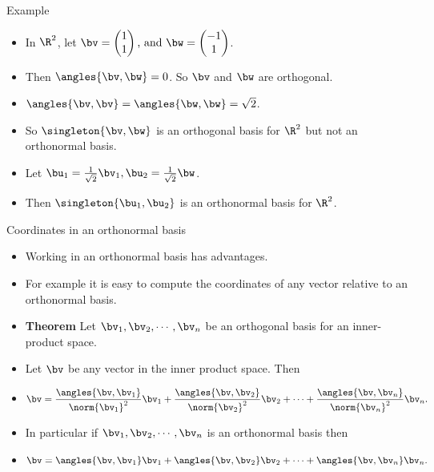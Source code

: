 \documentclass{beamer}
\begin{document}
\begin{frame}{Example}

\begin{itemize}
\item In $\R^2$, let $\bv=
\begin{pmatrix}
1 \\ 1
\end{pmatrix}
\text{, and }
\bw=
\begin{pmatrix}
-1 \\ 1
\end{pmatrix}
$.
\item Then $\angles{\bv,\bw}=0$. So $\bv$ and $\bw$ are orthogonal.
\item $\angles{\bv,\bv}=\angles{\bw,\bw}=\sqrt{2}$.
\item So $\singleton{\bv,\bw}$ is an orthogonal basis for $\R^2$ but not an orthonormal basis.
\item Let $\bu_1 = \frac{1}{\sqrt{2}}\bv_1, \bu_2=\frac{1}{\sqrt{2}}\bw$.
\item Then $\singleton{\bu_1,\bu_2}$ is an orthonormal basis for $\R^2$.
\end{itemize}
\end{frame}

\begin{frame}{Coordinates in an orthonormal basis}
\begin{itemize}
\item Working in an orthonormal basis has advantages.
\item For example it is easy to compute the coordinates of any vector relative to an orthonormal basis.
\item \textbf{Theorem} Let $\bv_1,\bv_2,\cdots,\bv_n$ be an orthogonal basis for an inner-product space.
\item Let $\bv$ be any vector in the inner product space. Then
\item $$\bv=\frac{\angles{\bv,\bv_1}}{\norm{\bv_1}^2}\bv_1 + \frac{\angles{\bv,\bv_2}}{\norm{\bv_2}^2}\bv_2+\cdots+\frac{\angles{\bv,\bv_n}}{\norm{\bv_n}^2}\bv_n.$$
\item In particular if $\bv_1,\bv_2,\cdots,\bv_n$ is an orthonormal basis then
\item $$\bv=\angles{\bv,\bv_1}\bv_1+\angles{\bv,\bv_2}\bv_2+\cdots+\angles{\bv,\bv_n}\bv_n.$$
\end{itemize}
\end{frame}
\end{document}
